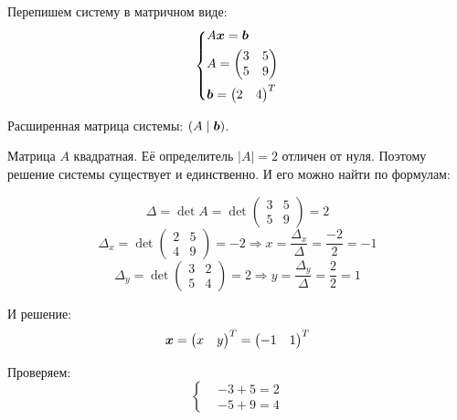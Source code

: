 \documentclass[a4paper,12pt]{article}
\begin{document}
  \begin{solution}
    Перепишем систему в матричном виде:
    \[
      \left\{
        \begin{aligned}
          &A \boldsymbol x = \boldsymbol b\\
          &A = \begin{pmatrix}
            3 & 5\\
            5 & 9
          \end{pmatrix}\\
          &\boldsymbol b = \begin{pmatrix}
            2 & 4
          \end{pmatrix}^T
        \end{aligned}
      \right.
    \]
    
    Расширенная матрица системы: $(A \mid \boldsymbol b)$.
    
    Матрица $A$ квадратная.
    Её определитель $|A| = 2$ отличен от нуля.
    Поэтому решение системы существует и единственно.
    И его можно найти по формулам:
    
    \[
      \Delta = \det A = \det \begin{pmatrix}
        3 & 5\\
        5 & 9
      \end{pmatrix} = 2
    \]
    \[
      \Delta_x = \det \begin{pmatrix}
        2 & 5\\
        4 & 9
      \end{pmatrix} = -2 \Rightarrow x = \frac{\Delta_x}{\Delta} = \frac{-2}{2} = -1
    \]
    \[
      \Delta_y = \det \begin{pmatrix}
        3 & 2\\
        5 & 4
      \end{pmatrix} = 2 \Rightarrow y = \frac{\Delta_y}{\Delta} = \frac{2}{2} = 1
    \]
    
    И решение:
    \[
      \boldsymbol x = \begin{pmatrix}
        x & y
      \end{pmatrix}^T = \begin{pmatrix}
        -1 & 1
      \end{pmatrix}^T
    \]
    
    Проверяем:
    \[
      \left\{
        \begin{aligned}
          &-3 + 5 = 2\\
          &-5 + 9 = 4
        \end{aligned}
      \right.
    \]
  \end{solution}
  
\end{document}
